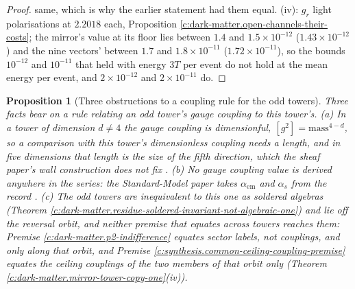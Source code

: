 \documentclass[11pt]{article}
\newtheorem{proposition}[theorem]{Proposition}
\theoremstyle{definition}
\theoremstyle{plain}
\newcommand{\changedmark}[2]{\marginpar{\raggedright\scriptsize\color{#1}#2}}
\begin{document}
\begin{proof}
same, which is why the earlier statement had them equal. (iv): $g_{r}$ light polarisations at $2.2018$ each, Proposition \ref{c:dark-matter.open-channels-their-costs}; the mirror's value at its floor lies between $1.4$ and $1.5 \times 10^{-12}$ ($1.43 \times 10^{-12}$) and the nine vectors' between $1.7$ and $1.8 \times 10^{-11}$ ($1.72 \times 10^{-11}$), so the bounds $10^{-12}$ and $10^{-11}$ that held with energy $3T$ per event do not hold at the mean energy per event, and $2 \times 10^{-12}$ and $2 \times 10^{-11}$ do.

\end{proof}

\begin{proposition}[Three obstructions to a coupling rule for the odd towers]\label{c:dark-matter.no-coupling-rule-odd-towers-follows}
\changedmark{BurntOrange}{changed since the deposit}
Three facts bear on a rule relating an odd tower's gauge coupling to this tower's. (a) In a tower of dimension $d \neq 4$ the gauge coupling is dimensionful, $[g^{2}] = \mathrm{mass}^{4-d}$, so a comparison with this tower's dimensionless coupling needs a length, and in five dimensions that length is the size of the fifth direction, which the sheaf paper's wall construction does not fix \cite{ButlerT4}. (b) No gauge coupling value is derived anywhere in the series: the Standard-Model paper takes $\alpha_{\mathrm{em}}$ and $\alpha_{s}$ from the record \cite[Fact 2.8, Prop.~6.1]{ButlerT12}. (c) The odd towers are inequivalent to this one as soldered algebras (Theorem \ref{c:dark-matter.residue-soldered-invariant-not-algebraic-one}) and lie off the reversal orbit, and neither premise that equates across towers reaches them: Premise \ref{c:dark-matter.p2-indifference} equates sector labels, not couplings, and only along that orbit, and Premise \ref{c:synthesis.common-ceiling-coupling-premise} equates the ceiling couplings of the two members of that orbit only (Theorem \ref{c:dark-matter.mirror-tower-copy-one}(iv)).
\end{proposition}
\end{document}
